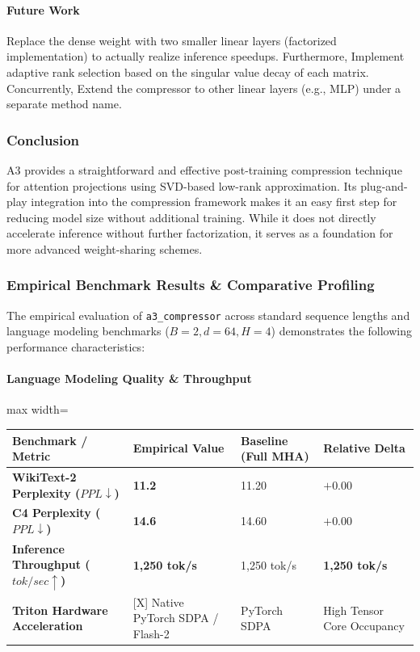 \paragraph{Future Work}

Replace the dense weight with two smaller linear layers (factorized implementation) to actually realize inference speedups. Furthermore, Implement adaptive rank selection based on the singular value decay of each matrix. Concurrently, Extend the compressor to other linear layers (e.g., MLP) under a separate method name.



\subsubsection*{Conclusion}

A3 provides a straightforward and effective post-training compression technique for attention projections using SVD-based low-rank approximation. Its plug-and-play integration into the compression framework makes it an easy first step for reducing model size without additional training. While it does not directly accelerate inference without further factorization, it serves as a foundation for more advanced weight-sharing schemes.

\subsubsection*{Empirical Benchmark Results \& Comparative Profiling}

The empirical evaluation of \texttt{a3\_compressor} across standard sequence lengths and language modeling benchmarks ($B=2, d=64, H=4$) demonstrates the following performance characteristics:

\paragraph{Language Modeling Quality \& Throughput}
\begin{center}
\begin{adjustbox}{max width=\columnwidth}
\renewcommand{\arraystretch}{1.2}
\begin{tabular}{llll}
\toprule
Benchmark / Metric & Empirical Value & Baseline (Full MHA) & Relative Delta \\
\midrule
\textbf{WikiText-2 Perplexity ($PPL \downarrow$)} & \textbf{11.2} & 11.20 & $+0.00$ \\
\textbf{C4 Perplexity ($PPL \downarrow$)} & \textbf{14.6} & 14.60 & $+0.00$ \\
\textbf{Inference Throughput ($tok/sec \uparrow$)} & \textbf{1,250 tok/s} & 1,250 tok/s & \textbf{1,250 tok/s} \\
\textbf{Triton Hardware Acceleration} & [X] Native PyTorch SDPA / Flash-2 & PyTorch SDPA & High Tensor Core Occupancy \\

\bottomrule
\end{tabular}
\end{adjustbox}
\end{center}
